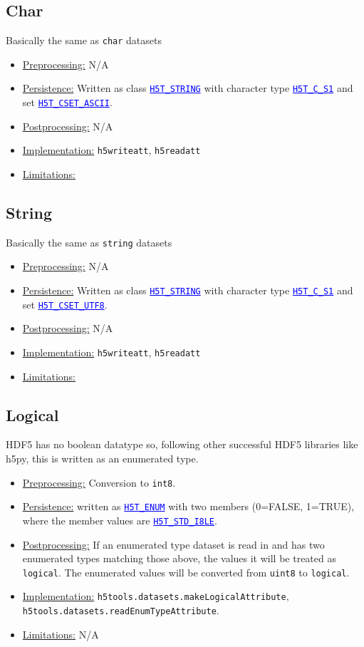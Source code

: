 \documentclass[11pt]{exam}
\newcommand\myurl[1]{\textcolor{blue}{\underline{#1}}}
\newcommand\myfcn[1]{\colorbox{codegray}{\textcolor{codeblue}{\texttt{#1}}}}
\newcommand\matfcn[1]{\textcolor{darkteal}{\texttt{#1}}}
\newcommand\hdftype[1]{\texttt{\myurl{#1}}}
\begin{document}
        \subsection{Char}
        \noindent Basically the same as \texttt{char} datasets
        \begin{itemize}
	        \item \underline{Preprocessing:} N/A
	        \item \underline{Persistence:} Written as class \hdftype{H5T\_STRING} with character type \hdftype{H5T\_C\_S1} and set \hdftype{H5T\_CSET\_ASCII}.
	        \item \underline{Postprocessing:} N/A
			\item \underline{Implementation:} \matfcn{h5writeatt}, \matfcn{h5readatt}
			\item \underline{Limitations:} 
	    \end{itemize}


        \subsection{String}
        \noindent Basically the same as \texttt{string} datasets
        \begin{itemize}
	        \item \underline{Preprocessing:} N/A
	        \item \underline{Persistence:} Written as class \hdftype{H5T\_STRING} with character type \hdftype{H5T\_C\_S1} and set \hdftype{H5T\_CSET\_UTF8}.
	        \item \underline{Postprocessing:} N/A
			\item \underline{Implementation:} \matfcn{h5writeatt}, \matfcn{h5readatt}
			\item \underline{Limitations:} 
	    \end{itemize}

		\subsection{Logical}
		\noindent HDF5 has no boolean datatype so, following other successful HDF5 libraries like h5py, this is written as an enumerated type.
		\begin{itemize}
			\item \underline{Preprocessing:} Conversion to \texttt{int8}.
			\item \underline{Persistence:} written as \myurl{\texttt{H5T\_ENUM}} with two members (0=FALSE, 1=TRUE), where the member values are \hdftype{H5T\_STD\_I8LE}. 
			\item \underline{Postprocessing:} If an enumerated type dataset is read in and has two enumerated types matching those above, the values it will be treated as \texttt{logical}. The enumerated values will be converted from \texttt{uint8} to \texttt{logical}. 
			\item \underline{Implementation:} \myfcn{h5tools.datasets.makeLogicalAttribute},\\ \myfcn{h5tools.datasets.readEnumTypeAttribute}.
			\item \underline{Limitations:} N/A
		\end{itemize}
        
\end{document}
